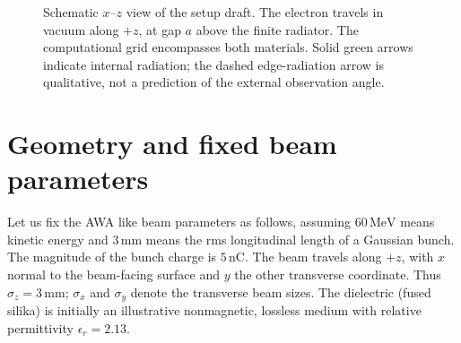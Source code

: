 \documentclass[11pt,a4paper]{article}
\newcommand{\unit}[1]{\,\mathrm{#1}}
\numberwithin{equation}{section}
\begin{document}
\begin{figure}[!ht]
\caption{Schematic \(x\)--\(z\) view of the setup draft.
The electron travels in vacuum along \(+z\), at gap \(a\) above the finite
radiator. The computational grid encompasses both materials. Solid green arrows indicate
internal radiation; the dashed edge-radiation arrow is qualitative, not a
prediction of the external observation angle.}
\label{fig:geometry}
\end{figure}





\section{Geometry and fixed beam parameters}
\label{sec:setup}

Let us fix the AWA like beam parameters as follows, assuming \(60\unit{MeV}\) means
kinetic energy and \(3\unit{mm}\) means the rms longitudinal length of a
Gaussian bunch. The magnitude of the bunch charge is \(5\unit{nC}\).
The beam travels along \(+z\), with \(x\) normal to the beam-facing surface
and \(y\) the other transverse coordinate. Thus \(\sigma_z=3\unit{mm}\);
\(\sigma_x\) and \(\sigma_y\) denote the transverse beam sizes.
The dielectric (fused silika) is initially an illustrative nonmagnetic, lossless medium
with relative permittivity \(\epsilon_r=2.13\). 
\end{document}
